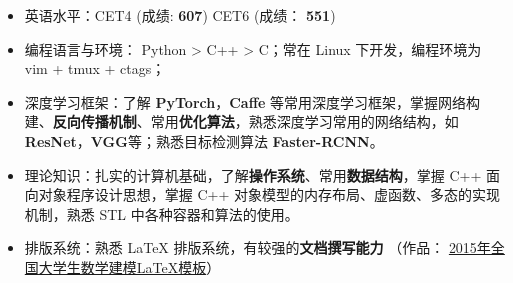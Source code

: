 \documentclass[paper=a4,fontsize=11pt,svgnames]{temp} %
\begin{document}
	
	
	\noindent
	\vspace*{-.9cm}
	\hspace*{0cm}
	\begin{minipage}{.96\textwidth}
		\begin{itemize}
			\item 英语水平：CET4 (成绩: \textbf{607}) \hspace*{1cm} CET6 (成绩： \textbf{551})
			\item 编程语言与环境： Python > C++ > C；常在 Linux 下开发，编程环境为 vim + tmux + ctags；
			\item 深度学习框架：了解 \textbf{PyTorch}，\textbf{Caffe} 等常用深度学习框架，掌握网络构建、\textbf{反向传播机制}、常用\textbf{优化算法}，熟悉深度学习常用的网络结构，如 \textbf{ResNet}，\textbf{VGG}等；熟悉目标检测算法 \textbf{Faster-RCNN}。
			\item 理论知识：扎实的计算机基础，了解\textbf{操作系统}、常用\textbf{数据结构}，掌握 C++ 面向对象程序设计思想，掌握 C++ 对象模型的内存布局、虚函数、多态的实现机制，熟悉 STL 中各种容器和算法的使用。
			\item 排版系统：熟悉 \LaTeX{} 排版系统，有较强的\textbf{文档撰写能力} （作品：
			\href{http://www.latexstudio.net/archives/4200}{2015年全国大学生数学建模LaTeX模板}）
		\end{itemize}
	\end{minipage}
	
	
\end{document}
